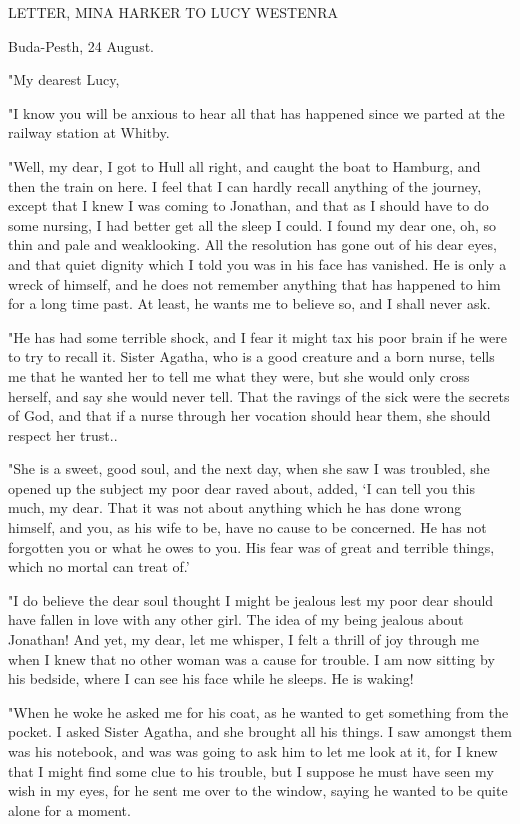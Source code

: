 LETTER, MINA HARKER TO LUCY WESTENRA 

Buda-Pesth, 24 August. 

"My dearest Lucy, 

"I know you will be anxious to hear all that has happened since we parted at the railway station at Whitby. 

"Well, my dear, I got to Hull all right, and caught the boat to Hamburg, and then the train on here. I feel that I can hardly recall anything of the journey, except that I knew I was coming to Jonathan, and that as I should have to do some nursing, I had better get all the sleep I could. I found my dear one, oh, so thin and pale and weaklooking. All the resolution has gone out of his dear eyes, and that quiet dignity which I told you was in his face has vanished. He is only a wreck of himself, and he does not remember anything that has happened to him for a long time past. At least, he wants me to believe so, and I shall never ask. 

"He has had some terrible shock, and I fear it might tax his poor brain if he were to try to recall it. Sister Agatha, who is a good creature and a born nurse, tells me that he wanted her to tell me what they were, but she would only cross herself, and say she would never tell. That the ravings of the sick were the secrets of God, and that if a nurse through her vocation should hear them, she should respect her trust.. 

"She is a sweet, good soul, and the next day, when she saw I was troubled, she opened up the subject my poor dear raved about, added, `I can tell you this much, my dear. That it was not about anything which he has done wrong himself, and you, as his wife to be, have no cause to be concerned. He has not forgotten you or what he owes to you. His fear was of great and terrible things, which no mortal can treat of.' 

"I do believe the dear soul thought I might be jealous lest my poor dear should have fallen in love with any other girl. The idea of my being jealous about Jonathan! And yet, my dear, let me whisper, I felt a thrill of joy through me when I knew that no other woman was a cause for trouble. I am now sitting by his bedside, where I can see his face while he sleeps. He is waking! 

"When he woke he asked me for his coat, as he wanted to get something from the pocket. I asked Sister Agatha, and she brought all his things. I saw amongst them was his notebook, and was was going to ask him to let me look at it, for I knew that I might find some clue to his trouble, but I suppose he must have seen my wish in my eyes, for he sent me over to the window, saying he wanted to be quite alone for a moment. 


